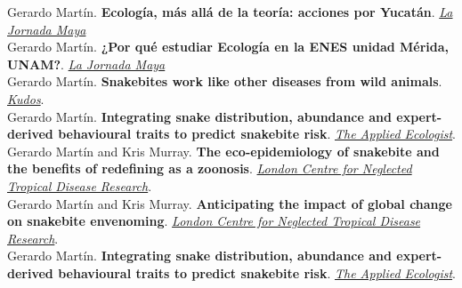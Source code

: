 \documentclass[11pt, letter]{article}
\newcommand{\years}[1]{\marginnote{\scriptsize #1}}
\begin{document}
\years{2024} Gerardo Martín. \textbf{Ecología, más allá de la teoría: acciones por Yucatán}. \href{https://www.lajornadamaya.mx/opinion/239885/ecologia-mas-alla-de-la-teoria-acciones-por-yucatan-enes-merida-licenciatura-en-ecologia?fbclid=IwZXh0bgNhZW0CMTEAAR2Hr0J4G5dg4AUF1my44-tFHsCSkOGubjrVqPHGqmGg9ilyM11NQyXEoYk_aem_z42Zb4dzd-X9Vj1vUxZpVw&sfnsn=scwspwa}{\emph{La Jornada Maya}}\\

\years{2024} Gerardo Martín. \textbf{¿Por qué estudiar Ecología en la ENES unidad Mérida, UNAM?}. \href{https://www.lajornadamaya.mx/opinion/226078/por-que-estudiar-ecologia-en-la-enes-unidad-merida-unam}{\emph{La Jornada Maya}}\\



\years{2023} Gerardo Martín. \textbf{Snakebites work like other diseases from wild animals}. \href{https://www.growkudos.com/publications/10.1371%25252Fjournal.pntd.0009867/reader}{\emph{Kudos}}. \\

\years{2022} Gerardo Mart\'in. \textbf{Integrating snake distribution, abundance and expert-derived behavioural traits to predict snakebite risk}. \href{https://appliedecologistsblog.com/2021/12/27/integrating-snake-distribution-abundance-and-expert-derived-behavioural-traits-to-predict-snakebite-risk/}{\emph{The Applied Ecologist}}. \\

\years{2021} Gerardo Martín and Kris Murray. \textbf{The eco-epidemiology of snakebite and the benefits of redefining as a zoonosis}. \href{https://www.londonntd.org/sites/lcntdr/files/content/attachments/2022-05-05/Innovative_research%202022.pdf} {\emph{London Centre for Neglected Tropical Disease Research}}. \\

\years{2021} Gerardo Martín and Kris Murray. \textbf{Anticipating the impact of global change on snakebite envenoming}. \href{https://www.londonntd.org/sites/lcntdr/files/content/attachments/2022-05-05/Innovative_research%202022.pdf} {\emph{London Centre for Neglected Tropical Disease Research}}. \\


\years{2021} Gerardo Mart\'in. \textbf{Integrating snake distribution, abundance and expert-derived behavioural traits to predict snakebite risk}. \href{https://appliedecologistsblog.com/2021/12/27/integrating-snake-distribution-abundance-and-expert-derived-behavioural-traits-to-predict-snakebite-risk/}{\emph{The Applied Ecologist}}.\\
\end{document}
